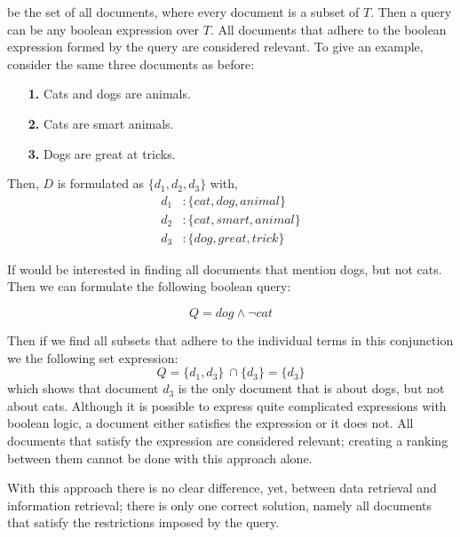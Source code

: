 be the set of all documents, where every document is a subset of $T$. Then a query can be any boolean expression over $T$. All documents that adhere to the boolean expression formed by the query are considered relevant. To give an example, consider the same three documents as before:

\begin{itemize}
	\item[\textbf{1.}] Cats and dogs are animals.
	\item[\textbf{2.}] Cats are smart animals.
	\item[\textbf{3.}] Dogs are great at tricks. 
\end{itemize}
Then, $D$ is formulated as $\{d_1, d_2, d_3\}$ with,
\begin{align}
d_1&: \{\mathit{cat}, \textit{dog}, \textit{animal}\} \\
d_2&: \{\mathit{cat}, \textit{smart}, \textit{animal}\} \\
d_3&: \{\mathit{dog}, \textit{great}, \textit{trick}\}
\end{align}

If would be interested in finding all documents that mention dogs, but not cats. Then we can formulate the following boolean query:

\begin{equation}
	Q = \mathit{dog} \land \neg \mathit{cat}
\end{equation}

Then if we find all subsets that adhere to the individual terms in this conjunction we the following set expression:
\begin{equation}
Q = \{d_1, d_3\}\ \cap \{d_3\} = \{d_3\}
\end{equation}
which shows that document $d_3$ is the only document that is about dogs, but not about cats. Although it is possible to express quite complicated expressions with boolean logic, a document either satisfies the expression or it does not. All documents that satisfy the expression are considered relevant; creating a ranking between them cannot be done with this approach alone. 

With this approach there is no clear difference, yet, between data retrieval and information retrieval; there is only one correct solution, namely all documents that satisfy the restrictions imposed by the query. 

